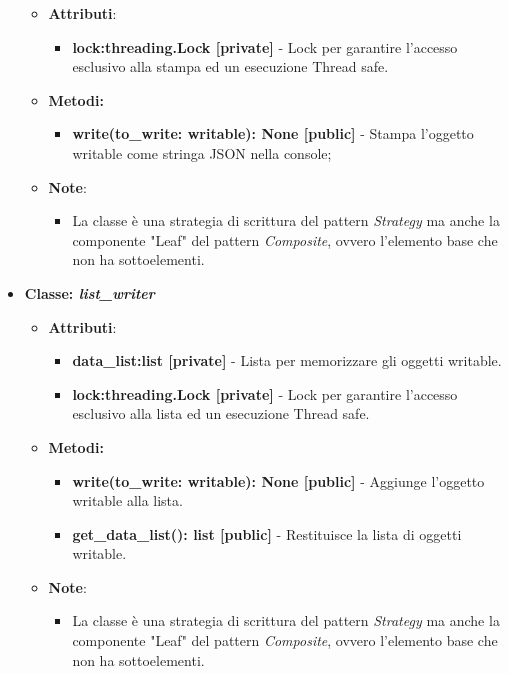 \begin{itemize}
    \begin{itemize}
    \item\textbf{Attributi}:
        \begin{itemize}
        \item \textbf{lock:threading.Lock [private]} - Lock per garantire l'accesso esclusivo alla stampa ed un esecuzione Thread safe.
    \end{itemize}
    \item \textbf{Metodi: }
    \begin{itemize}
        \item \textbf{write(to\_write: writable): None [public]} - Stampa l'oggetto writable come stringa JSON nella console;
    \end{itemize}
    \item\textbf{Note}:
        \begin{itemize}
            \item La classe è una strategia di scrittura del pattern \textit{Strategy} ma anche la componente "Leaf" del pattern \textit{Composite}, ovvero l'elemento base che non ha sottoelementi.
        \end{itemize}
    \end{itemize}
    \item{\textbf{Classe: \textit{list\_writer}}}
    \begin{itemize}
    \item\textbf{Attributi}:
        \begin{itemize}
        \item \textbf{data\_list:list [private]} - Lista per memorizzare gli oggetti writable.
        \item \textbf{lock:threading.Lock [private]} - Lock per garantire l'accesso esclusivo alla lista ed un esecuzione Thread safe.
    \end{itemize}
    \item \textbf{Metodi: }
    \begin{itemize}
        \item \textbf{write(to\_write: writable): None [public]} - Aggiunge l'oggetto writable alla lista.
        \item \textbf{get\_data\_list(): list [public]} - Restituisce la lista di oggetti writable.
    \end{itemize}
    \item\textbf{Note}:
        \begin{itemize}
            \item La classe è una strategia di scrittura del pattern \textit{Strategy} ma anche la componente "Leaf" del pattern \textit{Composite}, ovvero l'elemento base che non ha sottoelementi.

\end{itemize}
\end{itemize}
\end{itemize}
